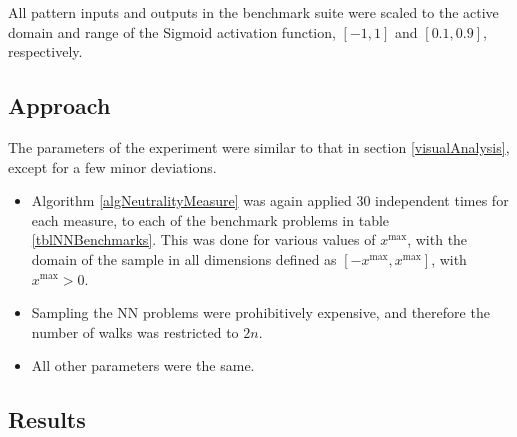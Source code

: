 \documentclass[conference]{IEEEtran}
\begin{document}
All pattern inputs and outputs in the benchmark suite were scaled to the active domain and range of the Sigmoid activation function, $[-1,1]$ and $[0.1,0.9]$, respectively.
	
\subsection{Approach}
\label{nnApproach}
The parameters of the experiment were similar to that in section \ref{visualAnalysis}, except for a few minor deviations.

\begin{itemize}
	\item Algorithm \ref{algNeutralityMeasure} was again applied 30 independent times for each measure, to each of the benchmark problems in table \ref{tblNNBenchmarks}. This was done for various values of $x^{\text{max}}$, with the domain of the sample in all dimensions defined as $[-x^{\text{max}}, x^{\text{max}}]$, with $x^{\text{max}} > 0$.
	\item Sampling the NN problems were prohibitively expensive, and therefore the number of walks was restricted to $2n$.
	\item All other parameters were the same.
\end{itemize}

\subsection{Results}
\label{nnResults}
\end{document}
